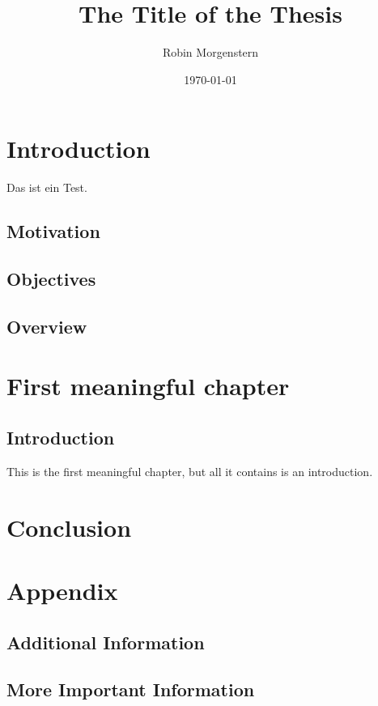 \documentclass[]{stthesis}
\title{The Title of the Thesis}
\author{Robin Morgenstern}
\date{\today}
\begin{document}
  \maketitle %
  
  \tableofcontents
  
  \chapter{Introduction}
    Das ist ein Test.
  	\section{Motivation}
  	\lipsum
  	
  	\section{Objectives}
  	\lipsum[1-3]
  	
  	\section{Overview}
	\lipsum[1]
    
  \chapter{First meaningful chapter}
  
     \section{Introduction}
       This is the first meaningful chapter, but all it contains is an introduction.

  \chapter{Conclusion}
  	\lipsum[1]

  \backmatter
  
  \appendix
  \chapter{Appendix}
  \section{Additional Information}
  \lipsum[1]
  
  \section{More Important Information}
  \lipsum[1]
  
\end{document}
